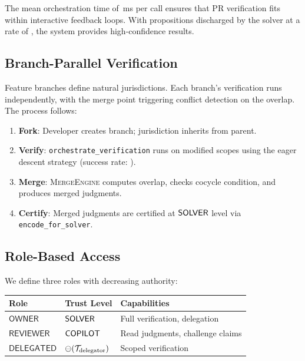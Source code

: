 \documentclass[11pt]{article}
\newcommand{\MergeEngine}{\textsc{MergeEngine}}
\newcommand{\DelegToken}{\mathsf{DELEGATED}}
\newcommand{\OwnerToken}{\mathsf{OWNER}}
\newcommand{\ReviewToken}{\mathsf{REVIEWER}}
\begin{document}
The mean orchestration time of \compProfOrchestrateVerificationMeanMs{}\,ms per
call ensures that PR verification fits within interactive feedback loops. With
\compTrustSolverdischarged{} propositions discharged by the solver at a rate of
\compTrustSolverdischargedPct{}, the system provides high-confidence results.

\subsection{Branch-Parallel Verification}

Feature branches define natural jurisdictions. Each branch's verification runs
independently, with the merge point triggering conflict detection on the
overlap. The process follows:

\begin{enumerate}[leftmargin=*]
  \item \textbf{Fork}: Developer creates branch; jurisdiction inherits from
        parent.
  \item \textbf{Verify}: \texttt{orchestrate\_verification} runs on modified
        scopes using the eager descent strategy (success rate:
        \compDescentEagerRate{}).
  \item \textbf{Merge}: \MergeEngine{} computes overlap, checks cocycle
        condition, and produces merged judgments.
  \item \textbf{Certify}: Merged judgments are certified at $\mathsf{SOLVER}$ level
        via \texttt{encode\_for\_solver}.
\end{enumerate}

\subsection{Role-Based Access}

We define three roles with decreasing authority:
\begin{center}
\begin{tabular}{lll}
\toprule
\textbf{Role} & \textbf{Trust Level} & \textbf{Capabilities} \\
\midrule
$\OwnerToken$ & $\mathsf{SOLVER}$ & Full verification, delegation \\
$\ReviewToken$ & $\mathsf{COPILOT}$ & Read judgments, challenge claims \\
$\DelegToken$ & $\ominus(\mathcal{T}_{\text{delegator}})$ & Scoped verification \\
\bottomrule
\end{tabular}
\end{center}
\end{document}

